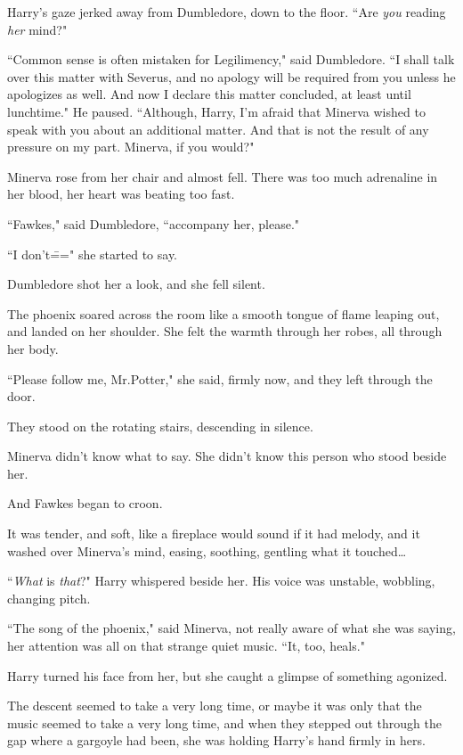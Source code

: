 Harry's gaze jerked away from Dumbledore, down to the floor. ``Are \emph{you} reading \emph{her} mind?"

``Common sense is often mistaken for Legilimency," said Dumbledore. ``I shall talk over this matter with Severus, and no apology will be required from you unless he apologizes as well. And now I declare this matter concluded, at least until lunchtime." He paused. ``Although, Harry, I'm afraid that Minerva wished to speak with you about an additional matter. And that is not the result of any pressure on my part. Minerva, if you would?"

Minerva rose from her chair and almost fell. There was too much adrenaline in her blood, her heart was beating too fast.

``Fawkes," said Dumbledore, ``accompany her, please."

``I don't\===" she started to say.

Dumbledore shot her a look, and she fell silent.

The phoenix soared across the room like a smooth tongue of flame leaping out, and landed on her shoulder. She felt the warmth through her robes, all through her body.

``Please follow me, Mr.\?Potter," she said, firmly now, and they left through the door.

\later

They stood on the rotating stairs, descending in silence.

Minerva didn't know what to say. She didn't know this person who stood beside her.

And Fawkes began to croon.

It was tender, and soft, like a fireplace would sound if it had melody, and it washed over Minerva's mind, easing, soothing, gentling what it touched{\ldots}

``\emph{What} is \emph{that}?" Harry whispered beside her. His voice was unstable, wobbling, changing pitch.

``The song of the phoenix," said Minerva, not really aware of what she was saying, her attention was all on that strange quiet music. ``It, too, heals."

Harry turned his face from her, but she caught a glimpse of something agonized.

The descent seemed to take a very long time, or maybe it was only that the music seemed to take a very long time, and when they stepped out through the gap where a gargoyle had been, she was holding Harry's hand firmly in hers.

